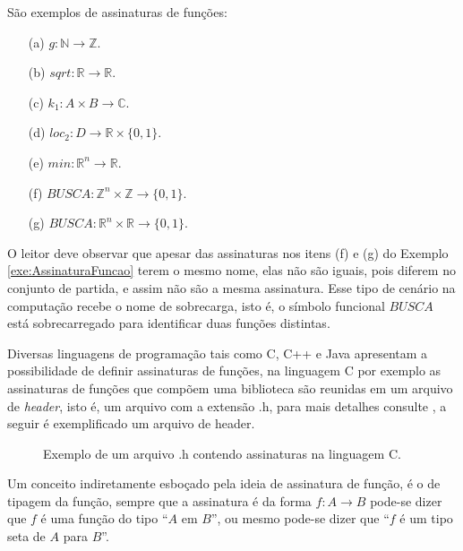\begin{example}\label{exe:AssinaturaFuncao}
	São exemplos de assinaturas de funções:
	\begin{itemize}
		\item[(a)] $g : \mathbb{N} \rightarrow \mathbb{Z}$.
		\item[(b)] $sqrt : \mathbb{R} \rightarrow \mathbb{R}$.
		\item[(c)] $k_1 : A \times B \rightarrow \mathbb{C}$.
		\item[(d)] $loc_2 : D \rightarrow \mathbb{R} \times \{0,1\}$.
		\item[(e)] $min : \mathbb{R}^n \rightarrow \mathbb{R}$.
		\item[(f)] $BUSCA : \mathbb{Z}^n \times \mathbb{Z} \rightarrow \{0,1\}$.
		\item[(g)] $BUSCA : \mathbb{R}^n \times \mathbb{R} \rightarrow \{0,1\}$.
	\end{itemize}
\end{example}

\begin{remark}
	O leitor deve observar que apesar das assinaturas nos itens (f) e (g) do Exemplo \ref{exe:AssinaturaFuncao} terem o mesmo nome, elas não são iguais, pois diferem no conjunto de partida, e assim não são a mesma assinatura. Esse tipo de cenário na computação recebe o nome de sobrecarga, isto é, o símbolo funcional $BUSCA$ está sobrecarregado para identificar duas funções distintas.
\end{remark}

Diversas linguagens de programação tais como C, C++ e Java apresentam a possibilidade de definir assinaturas de funções, na linguagem C por exemplo as assinaturas de funções que compõem uma biblioteca são reunidas em um arquivo de \textit{header}, isto é, um arquivo com a extensão .h, para mais detalhes consulte \cite{paulo2009algoritmos}, a seguir é exemplificado um arquivo de header.

\begin{figure}[h]
	
	\caption{Exemplo de um arquivo .h contendo assinaturas na linguagem C.}
\end{figure}

Um conceito indiretamente esboçado pela ideia de assinatura de função, é o de tipagem da função, sempre que a assinatura é da forma $f: A \rightarrow B$ pode-se dizer que $f$ é uma função do tipo ``$A$ em $B$'', ou mesmo pode-se dizer que ``$f$ é um tipo seta de $A$ para $B$''.

